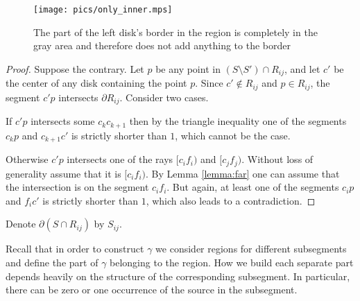 \begin{figure}[h!]
    \centering
    \texttt{[image: pics/only\_inner.mps]}
    \captionsetup{width=.7\textwidth}
    \caption{The part of the left disk's border in the region is completely in the gray area and therefore does not add anything to the border}
    \label{fig:only_inner}
\end{figure}


\begin{proof}
Suppose the contrary. Let $p$ be any point in $(S\setminus S')\cap R_{ij}$, and let $c'$ be the center of any disk containing the point $p$. Since $c'\not\in R_{ij}$ and $p\in R_{ij}$, the segment $c'p$ intersects $\partial{R_{ij}}$. Consider two cases.

If $c'p$ intersects some $c_kc_{k+1}$ then by the triangle inequality one of the segments $c_kp$ and $c_{k+1}c'$ is strictly shorter than $1$, which cannot be the case.

Otherwise $c'p$ intersects one of the rays $[c_if_i)$ and $[c_jf_j)$. Without loss of generality assume that it is $[c_if_i)$. By Lemma \ref{lemma:far} one can assume that the intersection is on the segment $c_if_i$. But again, at least one of the segments $c_ip$ and $f_ic'$ is strictly shorter than $1$, which also leads to a contradiction.
\end{proof}


Denote $\partial(S\cap R_{ij})$ by $S_{ij}$.

Recall that in order to construct $\gamma$ we consider regions for different subsegments and define the part of $\gamma$ belonging to the region. How we build each separate part depends heavily on the structure of the corresponding subsegment. In particular, there can be zero or one occurrence of the source in the subsegment.


